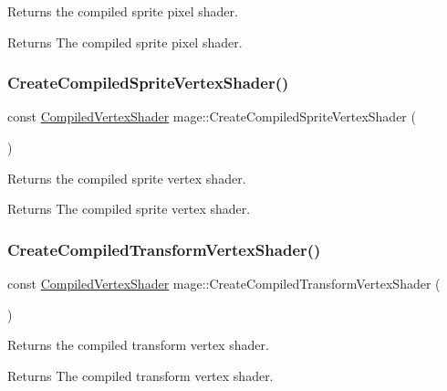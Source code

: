 Returns the compiled sprite pixel shader.

\begin{DoxyReturn}{Returns}
The compiled sprite pixel shader. 
\end{DoxyReturn}
\hypertarget{namespacemage_a691c61df584113076792d13d0a612bb6}{}\label{namespacemage_a691c61df584113076792d13d0a612bb6} 
\subsubsection{\texorpdfstring{Create\+Compiled\+Sprite\+Vertex\+Shader()}{CreateCompiledSpriteVertexShader()}}
{\footnotesize\ttfamily const \hyperlink{structmage_1_1_compiled_vertex_shader}{Compiled\+Vertex\+Shader} mage\+::\+Create\+Compiled\+Sprite\+Vertex\+Shader (\begin{DoxyParamCaption}{ }\end{DoxyParamCaption})}

Returns the compiled sprite vertex shader.

\begin{DoxyReturn}{Returns}
The compiled sprite vertex shader. 
\end{DoxyReturn}
\hypertarget{namespacemage_a294f1637436bccffdf4d13aff8f104ac}{}\label{namespacemage_a294f1637436bccffdf4d13aff8f104ac} 
\subsubsection{\texorpdfstring{Create\+Compiled\+Transform\+Vertex\+Shader()}{CreateCompiledTransformVertexShader()}}
{\footnotesize\ttfamily const \hyperlink{structmage_1_1_compiled_vertex_shader}{Compiled\+Vertex\+Shader} mage\+::\+Create\+Compiled\+Transform\+Vertex\+Shader (\begin{DoxyParamCaption}{ }\end{DoxyParamCaption})}

Returns the compiled transform vertex shader.

\begin{DoxyReturn}{Returns}
The compiled transform vertex shader. 
\end{DoxyReturn}
\hypertarget{namespacemage_a5eed34f604a40811bb0282dff7e6e712}{}\label{namespacemage_a5eed34f604a40811bb0282dff7e6e712} 
